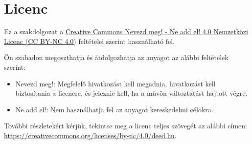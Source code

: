 \section*{Licenc}

Ez a szakdolgozat a 
\href{https://creativecommons.org/licenses/by-nc/4.0/deed.hu}{Creative Commons Nevezd meg! - Ne add el! 4.0 Nemzetközi Licenc (CC BY-NC 4.0)} feltételei szerint használható fel. 

Ön szabadon megoszthatja és átdolgozhatja az anyagot az alábbi feltételek szerint:
\begin{itemize}
  \item Nevezd meg!: Megfelelő hivatkozást kell megadnia, hivatkozást kell biztosítania a licencre, és jeleznie kell, ha a művön változtatást hajtott végre.
  \item Ne add el!: Nem használhatja fel az anyagot kereskedelmi célokra.
\end{itemize}

További részletekért kérjük, tekintse meg a licenc teljes szövegét az alábbi címen:
\url{https://creativecommons.org/licenses/by-nc/4.0/deed.hu}.

